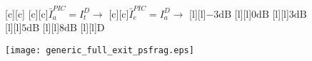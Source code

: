 \documentclass{article}
\begin{document}
\begin{figure}[htb]
  \begin{center}

        [c][c]{}
        [c][c]{$\bar{I}_a^{PIC}=I_t^D \rightarrow$}
        [c][c]{$\bar{I}_e^{PIC}=I_a^D \rightarrow$}
        [l][l]{$\mathrm{-3dB}$}
        [l][l]{$\mathrm{0dB}$}
	[l]{$\mathrm{3dB}$}
	[l]{$\mathrm{5dB}$}
        [l][l]{$\mathrm{8dB}$}       
	[l]{$\mathrm{D}$}

    \texttt{[image: generic\_full\_exit\_psfrag.eps]}
    \end{center}
\end{figure}
\end{document}

